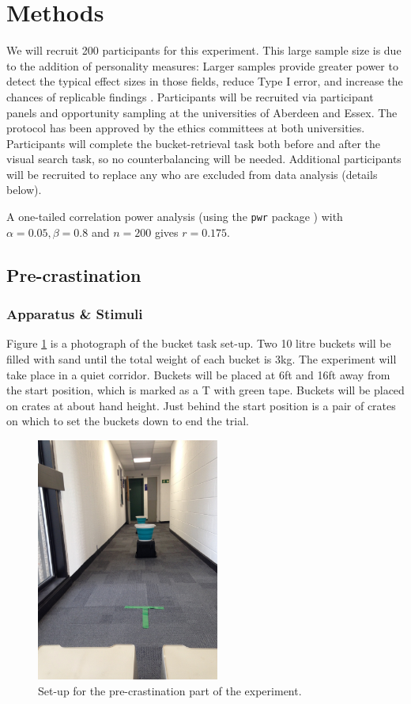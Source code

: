 \documentclass[]{rsos}
\begin{document}
\section{Methods}

We will recruit 200 participants for this experiment. This large sample size is due to the addition of personality measures: Larger samples provide greater power to detect the typical effect sizes in those fields, reduce Type I error, and increase the chances of replicable findings \cite{fraley2014}. Participants will be recruited via participant panels and opportunity sampling at the universities of Aberdeen and Essex. The protocol has been approved by the ethics committees at both universities. Participants will complete the bucket-retrieval task both before and after the visual search task, so no counterbalancing will be needed. Additional participants will be recruited to replace any who are excluded from data analysis (details below). 

A one-tailed correlation power analysis (using the \texttt{pwr} package \cite{pwr}) with $\alpha=0.05, \beta=0.8$ and $n=200$ gives $r=0.175$.

\subsection{Pre-crastination}
\label{sec:pre-crastination_methods}
\subsubsection{Apparatus \& Stimuli}

Figure \ref{fig:buckets} is a photograph of the bucket task set-up. Two 10 litre buckets will be filled with sand until the total weight of each bucket is 3kg. The experiment will take place in a quiet corridor. Buckets will be placed at 6ft and 16ft away from the start position, which is marked as a T with green tape. Buckets will be placed on crates at about hand height. Just behind the start position is a pair of crates on which to set the buckets down to end the trial.

\begin{figure}
\centering
\includegraphics[width=6cm]{Figures/IMG_7939.jpg}
\caption{Set-up for the pre-crastination part of the experiment.}
\label{fig:buckets}
\end{figure}
\end{document}
